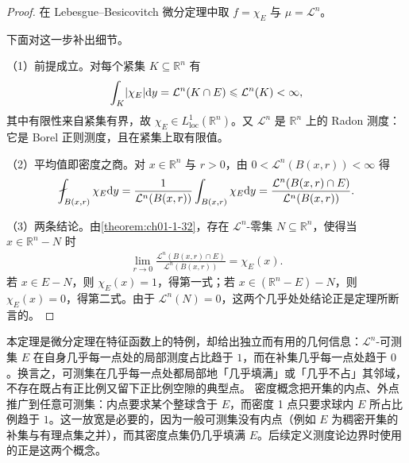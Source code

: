 \documentclass[../../main.tex]{subfiles}%
\begin{document}
\begin{proof}
在 Lebesgue--Besicovitch 微分定理中取 $f=\chi_{E}$ 与 $\mu=\mathcal{L}^{n}$。

下面对这一步补出细节。

（1）前提成立。对每个紧集 $K\subseteq\mathbb{R}^n$ 有
\begin{align*}
\int_K\lvert\chi_{E}\rvert\mathrm{d} y=\mathcal{L}^{n}(K\cap E)\leqslant\mathcal{L}^{n}(K)<\infty ,
\end{align*}
其中有限性来自紧集有界，故 $\chi_{E}\in L^{1}_{\mathrm{loc}}(\mathbb{R}^n)$。又 $\mathcal{L}^{n}$ 是 $\mathbb{R}^n$ 上的 Radon 测度：它是 Borel 正则测度，且在紧集上取有限值。

（2）平均值即密度之商。对 $x\in\mathbb{R}^n$ 与 $r>0$，由 $0<\mathcal{L}^{n}(B(x,r))<\infty$ 得
\begin{align*}
\fint_{B(x,r)}\chi_{E}\diff y=\frac{1}{\mathcal{L}^{n}(B(x,r))}\int_{B(x,r)}\chi_{E}\diff y=\frac{\mathcal{L}^{n}(B(x,r)\cap E)}{\mathcal{L}^{n}(B(x,r))} .
\end{align*}

（3）两条结论。由\cref{theorem:ch01-1-32}，存在 $\mathcal{L}^{n}$-零集 $N\subseteq\mathbb{R}^n$，使得当 $x\in\mathbb{R}^n-N$ 时%
\begin{align*}
\lim_{r\to0}\frac{\mathcal{L}^{n}(B(x,r)\cap E)}{\mathcal{L}^{n}(B(x,r))}=\chi_{E}(x) .
\end{align*}
若 $x\in E-N$，则 $\chi_{E}(x)=1$，得第一式；若 $x\in(\mathbb{R}^n-E)-N$，则 $\chi_{E}(x)=0$，得第二式。由于 $\mathcal{L}^{n}(N)=0$，这两个几乎处处结论正是定理所断言的。%
\end{proof}

\begin{remark}\label{remark:ch01-thm-1-35-动机}
本定理是微分定理在特征函数上的特例，却给出独立而有用的几何信息：$\mathcal{L}^{n}$-可测集 $E$ 在自身几乎每一点处的局部测度占比趋于 $1$，而在补集几乎每一点处趋于 $0$。换言之，可测集在几乎每一点处都局部地「几乎填满」或「几乎不占」其邻域，不存在既占有正比例又留下正比例空隙的典型点。%
密度概念把开集的内点、外点推广到任意可测集：内点要求某个整球含于 $E$，而密度 1 点只要求球内 $E$ 所占比例趋于 $1$。这一放宽是必要的，因为一般可测集没有内点（例如 $E$ 为稠密开集的补集与有理点集之并），而其密度点集仍几乎填满 $E$。后续定义测度论边界时使用的正是这两个概念。
\end{remark}
\end{document}

